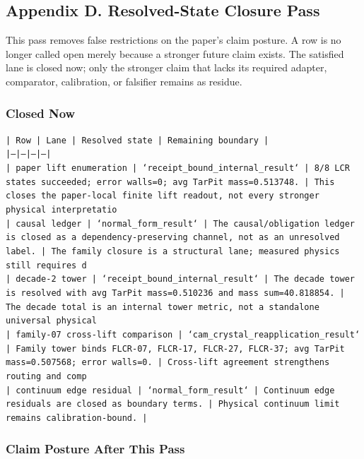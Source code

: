 \documentclass[11pt]{article}
\begin{document}
\subsection*{Appendix D. Resolved-State Closure Pass}

This pass removes false restrictions on the paper's claim posture. A row is no longer called open merely because a stronger future claim exists. The satisfied lane is closed now; only the stronger claim that lacks its required adapter, comparator, calibration, or falsifier remains as residue.

\subsubsection*{Closed Now}

\noindent\texttt{| Row | Lane | Resolved state | Remaining boundary |}\\
\noindent\texttt{|---|---|---|---|}\\
\noindent\texttt{| paper lift enumeration | `receipt\_bound\_internal\_result` | 8/8 LCR states succeeded; error walls=0; avg TarPit mass=0.513748. | This closes the paper-local finite lift readout, not every stronger physical interpretatio}\\
\noindent\texttt{| causal ledger | `normal\_form\_result` | The causal/obligation ledger is closed as a dependency-preserving channel, not as an unresolved label. | The family closure is a structural lane; measured physics still requires d}\\
\noindent\texttt{| decade-2 tower | `receipt\_bound\_internal\_result` | The decade tower is resolved with avg TarPit mass=0.510236 and mass sum=40.818854. | The decade total is an internal tower metric, not a standalone universal physical }\\
\noindent\texttt{| family-07 cross-lift comparison | `cam\_crystal\_reapplication\_result` | Family tower binds FLCR-07, FLCR-17, FLCR-27, FLCR-37; avg TarPit mass=0.507568; error walls=0. | Cross-lift agreement strengthens routing and comp}\\
\noindent\texttt{| continuum edge residual | `normal\_form\_result` | Continuum edge residuals are closed as boundary terms. | Physical continuum limit remains calibration-bound. |}\\

\subsubsection*{Claim Posture After This Pass}
\end{document}
